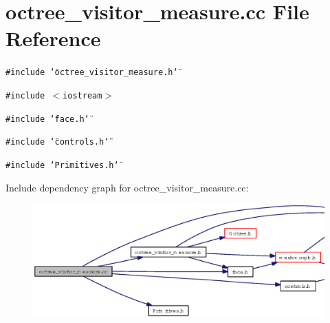 \section{octree\_\-visitor\_\-measure.cc File Reference}
\label{octree__visitor__measure_8cc}
{\tt \#include \char`\"{}octree\_\-visitor\_\-measure.h\char`\"{}}\par
{\tt \#include $<$iostream$>$}\par
{\tt \#include \char`\"{}face.h\char`\"{}}\par
{\tt \#include \char`\"{}controls.h\char`\"{}}\par
{\tt \#include \char`\"{}Primitives.h\char`\"{}}\par


Include dependency graph for octree\_\-visitor\_\-measure.cc:\begin{figure}[H]
\begin{center}
\leavevmode
\includegraphics[width=345pt]{octree__visitor__measure_8cc__incl}
\end{center}
\end{figure}
